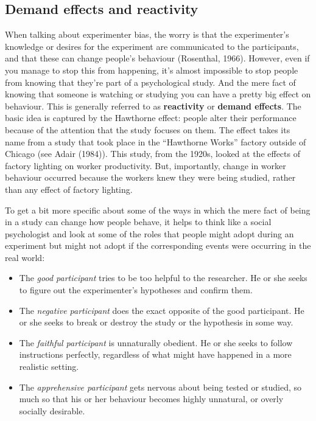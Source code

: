 \documentclass[
  letterpaper,
]{book}
\providecommand{\tightlist}{%
  \setlength{\itemsep}{0pt}\setlength{\parskip}{0pt}}\usepackage{longtable,booktabs,array}
\begin{document}
\hypertarget{demand-effects-and-reactivity}{%
\subsection{Demand effects and
reactivity}\label{demand-effects-and-reactivity}}

When talking about experimenter bias, the worry is that the
experimenter's knowledge or desires for the experiment are communicated
to the participants, and that these can change people's behaviour
(Rosenthal, 1966). However, even if you manage to stop this from
happening, it's almost impossible to stop people from knowing that
they're part of a psychological study. And the mere fact of knowing that
someone is watching or studying you can have a pretty big effect on
behaviour. This is generally referred to as \textbf{reactivity} or
\textbf{demand effects}. The basic idea is captured by the Hawthorne
effect: people alter their performance because of the attention that the
study focuses on them. The effect takes its name from a study that took
place in the ``Hawthorne Works'' factory outside of Chicago (see Adair
(1984)). This study, from the 1920s, looked at the effects of factory
lighting on worker productivity. But, importantly, change in worker
behaviour occurred because the workers knew they were being studied,
rather than any effect of factory lighting.

To get a bit more specific about some of the ways in which the mere fact
of being in a study can change how people behave, it helps to think like
a social psychologist and look at some of the roles that people might
adopt during an experiment but might not adopt if the corresponding
events were occurring in the real world:

\begin{itemize}
\tightlist
\item
  The \emph{good participant} tries to be too helpful to the researcher.
  He or she seeks to figure out the experimenter's hypotheses and
  confirm them.
\item
  The \emph{negative participant} does the exact opposite of the good
  participant. He or she seeks to break or destroy the study or the
  hypothesis in some way.
\item
  The \emph{faithful participant} is unnaturally obedient. He or she
  seeks to follow instructions perfectly, regardless of what might have
  happened in a more realistic setting.
\item
  The \emph{apprehensive participant} gets nervous about being tested or
  studied, so much so that his or her behaviour becomes highly
  unnatural, or overly socially desirable.
\end{itemize}
\end{document}

